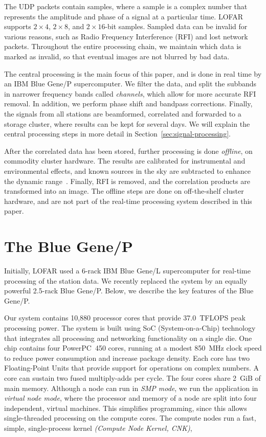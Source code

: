\documentclass[10pt]{article}
\begin{document}
The UDP packets contain samples, where a sample is a complex number
that represents the amplitude and phase of a signal at a particular
time.  LOFAR supports $2\times4$, $2\times8$, and $2\times16$-bit
samples. Sampled data can be invalid for various reasons, such as
Radio Frequency Interference (RFI) and lost network packets.
Throughout the entire processing chain, we maintain which
data is marked as invalid, so that eventual images are not blurred by
bad data.  

The central processing is the main focus of this paper, and is done in
real time by an IBM Blue Gene/P supercomputer. We filter the data, and
split the subbands in narrower frequency bands called \emph{channels}, which allow
for more accurate RFI removal.
In addition, we perform phase shift and bandpass
corrections.  Finally, the signals from all stations are beamformed,
correlated and forwarded to a storage cluster, where results can be
kept for several days.  We will explain the central processing steps
in more detail in Section~\ref{sec:signal-processing}.

After the correlated data has been stored, further processing is done
\emph{offline}, on commodity cluster hardware. 
The results are calibrated for instrumental and environmental
effects, and known sources in the sky are subtracted to
enhance the dynamic range~\cite{Nijboer:07}. Finally, RFI is removed, 
and the correlation products are
transformed into an image.  The offline steps are done on
off-the-shelf cluster hardware, and are not part of the real-time
processing system described in this paper.


\section{The Blue Gene/P}

Initially, LOFAR used a 6-rack IBM Blue Gene/L supercomputer for real-time
processing of the station data.
We recently replaced the system by an equally powerful 2.5-rack Blue Gene/P.
Below, we describe the key features of the Blue Gene/P.

Our system contains 10,880 processor cores that provide 37.0~TFLOPS peak
processing power.
The system is built using SoC (System-on-a-Chip) technology that integrates
all processing and networking functionality on a single die.
One chip contains four PowerPC~450 cores, running at a modest 850~MHz clock
speed to reduce power consumption and increase package density.
Each core has two Floating-Point Units that provide support for
operations on complex numbers.
A core can sustain two fused multiply-adds per cycle.
The four cores share 2~GiB of main memory.
Although a node can run in \emph{SMP mode}, we run the application in
\emph{virtual node mode}, where the processor and memory of a node are split
into four independent, virtual machines.
This simplifies programming, since this allows single-threaded processing
on the compute cores.  %
The compute nodes run a fast, simple, single-process kernel
\emph{(Compute Node Kernel, CNK)},
\end{document}
